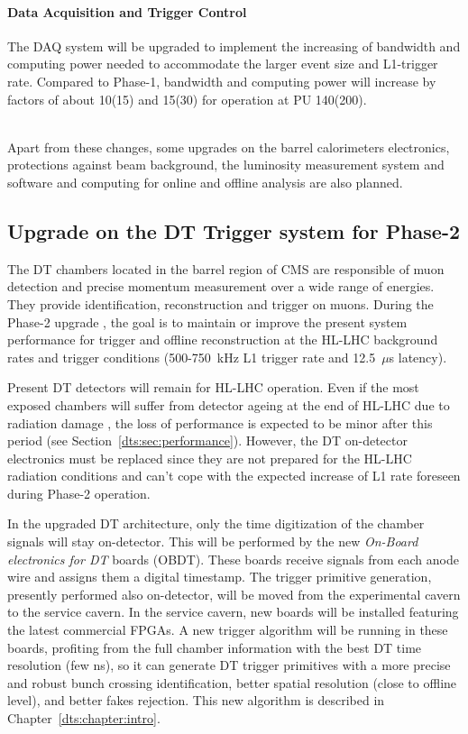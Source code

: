 \documentclass[../main.tex]{subfiles}
\begin{document}
\paragraph{Data Acquisition and Trigger Control}

The DAQ system will be upgraded to implement the increasing of bandwidth and computing power needed to accommodate the larger event size and L1-trigger rate. Compared to Phase-1, bandwidth and computing power will increase by factors of about 10(15) and 15(30) for operation at PU 140(200).

~\\Apart from these changes, some upgrades on the barrel calorimeters electronics, protections against beam background, the luminosity measurement system and software and computing for online and offline analysis are also planned. 


\subsection{Upgrade on the DT Trigger system for Phase-2}
\label{intro:subsec:dt_upgrade}

The DT chambers located in the barrel region of CMS are responsible of muon detection and precise momentum measurement over a wide range of energies. They provide identification, reconstruction and trigger
on muons. During the Phase-2 upgrade \cite{muontdr, l1tdr}, the goal is to maintain or improve the present system performance for trigger and offline reconstruction at the HL-LHC background rates and trigger conditions (500-750~kHz L1 trigger rate and 12.5~$\mu$s latency).

Present DT detectors will remain for HL-LHC operation. Even if the most exposed chambers will suffer from detector ageing at the end of HL-LHC due to radiation damage \cite{muontdr}, the loss of performance is expected to be minor after this period (see Section~\ref{dts:sec:performance}). However, the DT on-detector electronics must be replaced since they are not prepared for the HL-LHC radiation conditions and can't cope with the expected increase of L1 rate foreseen during Phase-2 operation.

In the upgraded DT architecture, only the time digitization of the chamber signals will stay on-detector. This will be performed by the new \textit{On-Board electronics for DT} boards (OBDT). These boards receive signals from each anode wire and assigns them a digital timestamp. The trigger primitive generation, presently performed also on-detector, will be moved from the experimental cavern to the service cavern. In the service cavern, new boards will be installed featuring the latest commercial FPGAs. A new trigger algorithm will be running in these boards, profiting from the full chamber information with the best DT time resolution (few ns), so it can generate DT trigger primitives with a more precise and robust bunch crossing identification, better spatial resolution (close to offline level), and better fakes rejection. This new algorithm is described in Chapter~\ref{dts:chapter:intro}.
\end{document}
